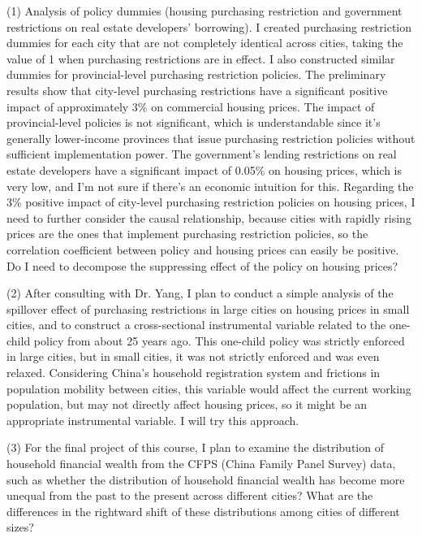 \documentclass[12pt,letterpaper]{article}
\begin{document}
(1) Analysis of policy dummies (housing purchasing restriction and government restrictions on real estate developers' borrowing). I created purchasing restriction dummies for each city that are not completely identical across cities, taking the value of 1 when purchasing restrictions are in effect. I also constructed similar dummies for provincial-level purchasing restriction policies. The preliminary results show that city-level purchasing restrictions have a significant positive impact of approximately 3\% on commercial housing prices. The impact of provincial-level policies is not significant, which is understandable since it's generally lower-income provinces that issue purchasing restriction policies without sufficient implementation power. The government's lending restrictions on real estate developers have a significant impact of 0.05\% on housing prices, which is very low, and I'm not sure if there's an economic intuition for this. Regarding the 3\% positive impact of city-level purchasing restriction policies on housing prices, I need to further consider the causal relationship, because cities with rapidly rising prices are the ones that implement purchasing restriction policies, so the correlation coefficient between policy and housing prices can easily be positive. Do I need to decompose the suppressing effect of the policy on housing prices?

(2) After consulting with Dr. Yang, I plan to conduct a simple analysis of the spillover effect of purchasing restrictions in large cities on housing prices in small cities, and to construct a cross-sectional instrumental variable related to the one-child policy from about 25 years ago. This one-child policy was strictly enforced in large cities, but in small cities, it was not strictly enforced and was even relaxed. Considering China's household registration system and frictions in population mobility between cities, this variable would affect the current working population, but may not directly affect housing prices, so it might be an appropriate instrumental variable. I will try this approach.

(3) For the final project of this course, I plan to examine the distribution of household financial wealth from the CFPS (China Family Panel Survey) data, such as whether the distribution of household financial wealth has become more unequal from the past to the present across different cities? What are the differences in the rightward shift of these distributions among cities of different sizes?


	
\end{document}

